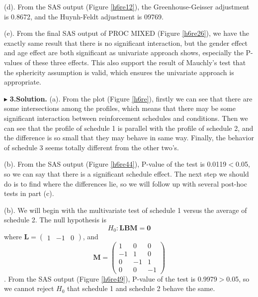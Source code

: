 \documentclass[letterpaper, 12pt]{article}
\newcommand{\lma}{\left(\begin{matrix}}
\newcommand{\rma}{\end{matrix}\right)}
\begin{document}
(d). From the SAS output (Figure \ref{h6re12}), the Greenhouse-Geisser adjustment is 0.8672, and the Huynh-Feldt adjustment is 09769.
         
(e). From the final SAS output of PROC MIXED (Figure \ref{h6re26}), we have the exactly same result that there is no significant interaction, but the gender effect and age effect are both significant  as univariate approach shows, especially the P-values of these three effects. This also support the result of Mauchly's test that the sphericity assumption is valid, which ensures the univariate approach is appropriate.










$\blacktriangleright$ \textbf{3.\quad Solution.} 
(a). From the plot (Figure \ref{h6re}), firstly we can see that there are some intersections among the profiles, which means that there may be some significant interaction between reinforcement schedules and conditions. Then we can see that the profile of schedule 1 is parallel with the profile of schedule 2, and the difference is so small that they may behave in same way. Finally, the behavior of schedule 3 seems totally different from the other two's.

(b). From the SAS output (Figure \ref{h6re44}), P-value of the test is 0.0119$<$0.05, so we can say that there is a significant schedule effect. The next step we should do is to find where the differences lie, so we will follow up with several post-hoc tests in part (c).

(b). We will begin with the multivariate test of schedule 1 versus the average of schedule 2. The null hypothesis is
$$
H_0:\bm{LBM}=\bm{0}
$$
where $\bm{L}=\lma 1&-1&0\rma$, and
$$\bm{M}=\lma1&0&0\\-1&1&0\\0&-1&1\\0&0&-1\rma$$.
From the SAS output (Figure \ref{h6re49}), P-value of the test is 0.9979$>$0.05, so we cannot reject $H_0$ that schedule 1 and schedule 2 behave the same.
         
\end{document}
